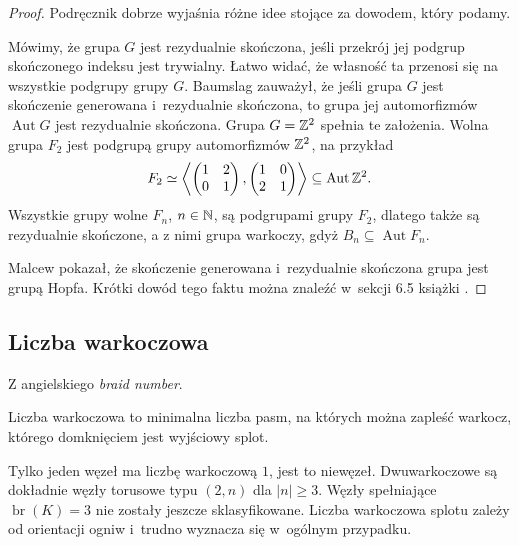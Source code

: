 \begin{proof}
    Podręcznik \cite{magnus66} dobrze wyjaśnia różne idee stojące za dowodem, który podamy.

    Mówimy, że grupa $G$ jest rezydualnie skończona, jeśli przekrój jej podgrup skończonego indeksu jest trywialny.
    Łatwo widać, że własność ta przenosi się na wszystkie podgrupy grupy $G$.
    Baumslag zauważył, że jeśli grupa $G$ jest skończenie generowana i~rezydualnie skończona, to grupa jej automorfizmów $\operatorname{Aut} G$ jest rezydualnie skończona.
    Grupa $G = \mathbb Z^2$ spełnia te założenia.
    Wolna grupa $F_2$ jest podgrupą grupy automorfizmów $\mathbb Z^2$, na przykład
    \begin{equation}
        F_2 \simeq \left\langle
        \begin{pmatrix}
            1 & 2 \\
            0 & 1
        \end{pmatrix},
        \begin{pmatrix}
            1 & 0 \\
            2 & 1
        \end{pmatrix}
        \right\rangle \subseteq \operatorname{Aut} \mathbb Z^2.
    \end{equation}
    Wszystkie grupy wolne $F_n$, $n \in \mathbb N$, są podgrupami grupy $F_2$, dlatego także są rezydualnie skończone, a z nimi grupa warkoczy, gdyż $B_n \subseteq \operatorname{Aut} F_n$.

    Malcew pokazał, że skończenie generowana i~rezydualnie skończona grupa jest grupą Hopfa.
    Krótki dowód tego faktu można znaleźć w~sekcji 6.5 książki \cite{magnus66}.
\end{proof}

\subsection{Liczba warkoczowa} %
\label{sub:braid_number}
Z angielskiego \emph{braid number}.

\begin{definition}
    Liczba warkoczowa to minimalna liczba pasm, na których można zapleść warkocz, którego domknięciem jest wyjściowy splot.
\end{definition}

Tylko jeden węzeł ma liczbę warkoczową $1$, jest to niewęzeł.
Dwuwarkoczowe są dokładnie węzły torusowe typu $(2, n)$ dla $|n| \ge 3$.
Węzły spełniające $\operatorname{br} (K) = 3$ nie zostały jeszcze sklasyfikowane.
Liczba warkoczowa splotu zależy od orientacji ogniw i~trudno wyznacza się w~ogólnym przypadku.

